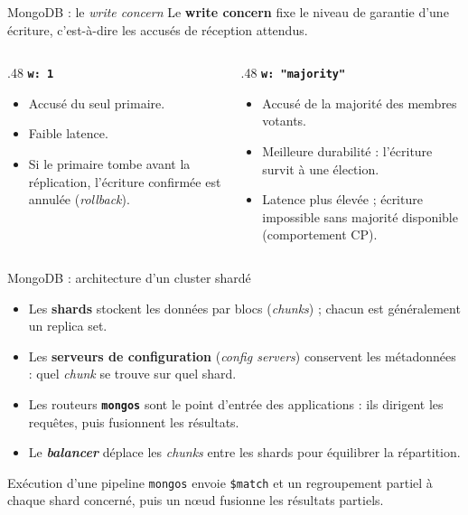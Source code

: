 \begin{frame}{MongoDB : le \textit{write concern}}
    Le \textbf{write concern} fixe le niveau de garantie d'une écriture,
    c'est-à-dire les accusés de réception attendus.

    \vspace{0.3cm}

    \begin{columns}[T,onlytextwidth]
        \begin{column}{.48\textwidth}
            \textbf{\texttt{w: 1}}
            \begin{itemize}
                \item Accusé du seul primaire.
                \item Faible latence.
                \item Si le primaire tombe avant la réplication, l'écriture
                      confirmée est annulée (\textit{rollback}).
            \end{itemize}
        \end{column}
        \begin{column}{.48\textwidth}
            \textbf{\texttt{w: "majority"}}
            \begin{itemize}
                \item Accusé de la majorité des membres votants.
                \item Meilleure durabilité : l'écriture survit à une élection.
                \item Latence plus élevée ; écriture impossible sans majorité
                      disponible (comportement CP).
            \end{itemize}
        \end{column}
    \end{columns}
\end{frame}

\begin{frame}{MongoDB : architecture d'un cluster shardé}
    \begin{itemize}
        \item Les \textbf{shards} stockent les données par blocs
              (\textit{chunks}) ; chacun est généralement un replica set.
        \item Les \textbf{serveurs de configuration} (\textit{config servers})
              conservent les métadonnées : quel \textit{chunk} se trouve sur
              quel shard.
        \item Les routeurs \textbf{\texttt{mongos}} sont le point d'entrée des
              applications : ils dirigent les requêtes, puis fusionnent les
              résultats.
        \item Le \textbf{\textit{balancer}} déplace les \textit{chunks} entre
              les shards pour équilibrer la répartition.
    \end{itemize}

    \begin{examplebox}{Exécution d'une pipeline}
        \texttt{mongos} envoie \texttt{\$match} et un regroupement partiel à
        chaque shard concerné, puis un nœud fusionne les résultats partiels.
    \end{examplebox}
\end{frame}


